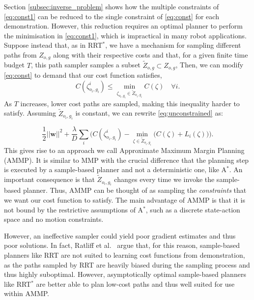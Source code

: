 \documentclass[a4paper,11pt]{report}
\begin{document}
Section \ref{subsec:inverse_problem} shows how the multiple constraints of \eqref{eq:const1} can be reduced to the single constraint of \eqref{eq:const} for each demonstration. However, this reduction requires an optimal planner to perform the minimisation in \eqref{eq:const1}, which is impractical in many robot applications. Suppose instead that, as in RRT$^*$, we have a mechanism for sampling different paths from $Z_{o,g}$ along with their respective costs and that, for a given finite time budget $T$, this path sampler samples a subset $\tilde{Z}_{o,g} \subset Z_{o,g}$,  Then, we can modify \eqref{eq:const} to demand that our cost function satisfies,
\begin{equation}
	C(\zeta^i_{o_i,g_i}) \leq \min_{\zeta_{o_i,g_i} \in \tilde{Z}_{o_i,g_i}} C(\zeta) \quad \forall i. \label{eq:const_rrt}
\end{equation}
	As $T$ increases, lower cost paths are sampled, making this inequality harder to satisfy. Assuming $\tilde{Z}_{o_i,g_i}$ is constant, we can rewrite \eqref{eq:unconstrained} as:

	\begin{equation} \frac{1}{2}||\mathbf{w}||^2 + \frac{\lambda}{D} \sum_i \big( C(\zeta^i_{o_i,g_i}) - \min_{\zeta \in \tilde{Z}_{o_i,g_i}}\big(C(\zeta) + L_i(\zeta)\big) \big). \label{eq:unconstrained_rrt}
	\end{equation}
This gives rise to an approach we call Approximate Maximum Margin Planning (AMMP). It is similar  to MMP with the crucial difference that the planning step is executed by a sample-based planner and not a deterministic one, like A$^*$. An important consequence is that $\tilde{Z}_{o_i,g_i}$ changes every time we invoke the sample-based planner. Thus, AMMP can be thought of as sampling the \emph{constraints} that we want our cost function to satisfy. The main advantage of AMMP is that it is not bound by the restrictive assumptions of  A$^*$, such as a discrete state-action space and no motion constraints. 

However, an ineffective sampler could yield poor gradient estimates and thus poor solutions. In fact, Ratliff et al.\ \cite{ratliff2009chomp} argue that, for this reason, sample-based planners like RRT are not suited to learning cost functions from demonstration, as the paths sampled by RRT are heavily biased during the sampling process and thus highly suboptimal. However, asymptotically optimal sample-based planners like RRT$^*$ are better able to plan low-cost paths \cite{karaman2011sampling} and thus well suited for use within AMMP.
\end{document}
